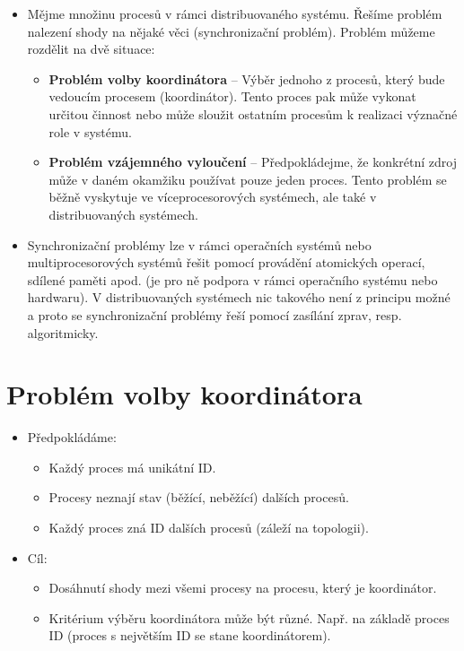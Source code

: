 \begin{itemize}
    \item Mějme množinu procesů v rámci distribuovaného systému. Řešíme problém  nalezení shody na nějaké věci (synchronizační problém). Problém můžeme rozdělit na dvě situace:
    \begin{itemize}
        \item \textbf{Problém volby koordinátora} -- Výběr jednoho z procesů, který bude vedoucím procesem (koordinátor). Tento proces pak může vykonat určitou činnost nebo může sloužit ostatním procesům k realizaci  význačné role v systému.
        \item \textbf{Problém vzájemného vyloučení} -- Předpokládejme, že konkrétní zdroj může v daném okamžiku používat pouze jeden proces. Tento problém se běžně vyskytuje ve víceprocesorových systémech, ale také v distribuovaných systémech.
    \end{itemize}
    \item Synchronizační problémy lze v rámci operačních systémů nebo multiprocesorových systémů řešit pomocí provádění atomických operací, sdílené paměti apod. (je pro ně podpora v rámci operačního systému nebo hardwaru). V distribuovaných systémech nic takového není z principu možné a proto se synchronizační problémy řeší pomocí zasílání zprav, resp. algoritmicky.
\end{itemize}


\section{Problém volby koordinátora}

\begin{itemize}
    \item Předpokládáme:
    \begin{itemize}
        \item Každý proces má unikátní ID.
        \item Procesy neznají stav (běžící, neběžící) dalších procesů.
        \item Každý proces zná ID dalších procesů (záleží na topologii).
    \end{itemize}
    \item Cíl:
    \begin{itemize}
        \item Dosáhnutí shody mezi všemi procesy na procesu, který je koordinátor.
        \item Kritérium výběru koordinátora může být různé. Např. na základě proces ID (proces s největším ID se stane koordinátorem).
    \end{itemize}
\end{itemize}

